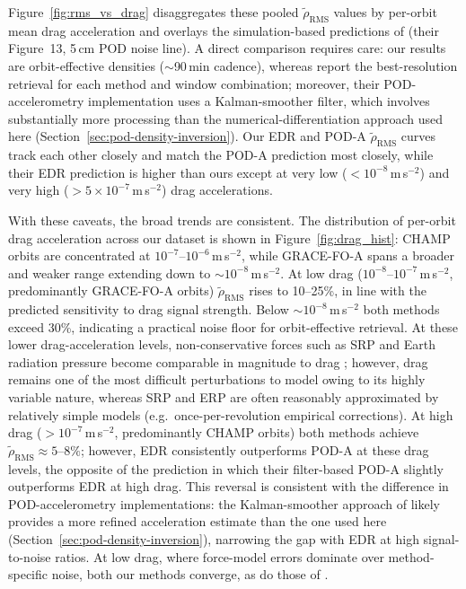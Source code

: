\documentclass[draft]{agujournal2019}
\begin{document}
Figure~\ref{fig:rms_vs_drag} disaggregates these pooled
$\tilde{\rho}_{\text{RMS}}$ values by per-orbit mean drag acceleration and
overlays the simulation-based predictions of 
(their Figure~13, 5\,cm POD noise line). A direct comparison
requires care: our results are orbit-effective densities
($\sim$90\,min cadence), whereas  report the
best-resolution retrieval for each method and window combination; moreover,
their POD-accelerometry implementation uses a Kalman-smoother filter, which
involves substantially more processing than the numerical-differentiation
approach used here (Section~\ref{sec:pod-density-inversion}). Our EDR and
POD-A $\tilde{\rho}_{\text{RMS}}$ curves track each other closely and match
the  POD-A prediction most closely, while their
EDR prediction is higher than ours except at very low
($<10^{-8}$\,m\,s$^{-2}$) and very high
($>5\times10^{-7}$\,m\,s$^{-2}$) drag accelerations.

With these caveats, the broad trends are consistent. The distribution of
per-orbit drag acceleration across our dataset is shown in
Figure~\ref{fig:drag_hist}: CHAMP orbits are concentrated at
$10^{-7}$--$10^{-6}$\,m\,s$^{-2}$, while GRACE-FO-A spans a broader and
weaker range extending down to $\sim\!10^{-8}$\,m\,s$^{-2}$. At low drag
($10^{-8}$--$10^{-7}$\,m\,s$^{-2}$, predominantly GRACE-FO-A orbits)
$\tilde{\rho}_{\text{RMS}}$ rises to 10--25\%, in line with the predicted
sensitivity to drag signal strength. Below
$\sim$$10^{-8}$\,m\,s$^{-2}$ both methods exceed 30\%, indicating a
practical noise floor for orbit-effective retrieval. At these lower drag-acceleration levels, non-conservative forces such as SRP
and Earth radiation pressure become comparable in magnitude to drag
\cite{Montenbruck2000}; however, drag remains one of the most difficult perturbations
to model owing to its highly variable nature, whereas SRP and ERP are often
reasonably approximated by relatively simple models (e.g.\ once-per-revolution
empirical corrections). At high drag
($>10^{-7}$\,m\,s$^{-2}$, predominantly CHAMP orbits) both methods achieve
$\tilde{\rho}_{\text{RMS}} \approx 5$--$8\%$; however, EDR consistently
outperforms POD-A at these drag levels, the opposite of the 
prediction in which their filter-based POD-A slightly outperforms EDR at
high drag. This reversal is consistent with the difference in
POD-accelerometry implementations: the Kalman-smoother approach of
 likely provides a more refined acceleration
estimate than the one used here (Section~\ref{sec:pod-density-inversion}),
narrowing the gap with EDR at high signal-to-noise ratios. At low drag, where force-model errors dominate
over method-specific noise, both our methods converge, as do those of
.
\end{document}
